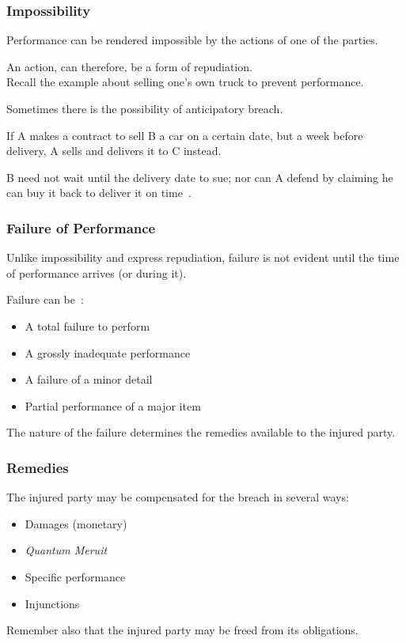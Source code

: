 \begin{frame}
\frametitle{Impossibility}

Performance can be rendered impossible by the actions of one of the parties.

An action, can therefore, be a form of repudiation.\\
\quad Recall the example about selling one's own truck to prevent performance.

Sometimes there is the possibility of \alert{anticipatory breach}.

If A makes a contract to sell B a car on a certain date, but a week before delivery, A sells and delivers it to C instead.

B need not wait until the delivery date to sue; nor can A defend by claiming he can buy it back to deliver it on time~\cite{lba}.

\end{frame}

\begin{frame}
\frametitle{Failure of Performance}

Unlike impossibility and express repudiation, failure is not evident until the time of performance arrives (or during it).

Failure can be~\cite{lba}:

\begin{itemize}
	\item A total failure to perform
	\item A grossly inadequate performance
	\item A failure of a minor detail
	\item Partial performance of a major item
\end{itemize}

The nature of the failure determines the remedies available to the injured party.

\end{frame}



\begin{frame}
\frametitle{Remedies}

The injured party may be compensated for the breach in several ways:

\begin{itemize}
	\item Damages (monetary)
	\item \textit{Quantum Meruit} 
	\item Specific performance
	\item Injunctions
\end{itemize}

Remember also that the injured party may be freed from its obligations.

\end{frame}



